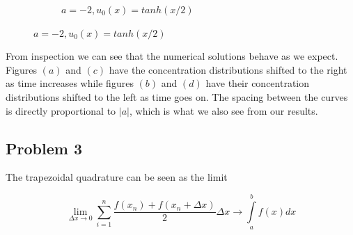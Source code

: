 \documentclass[10pt]{article}
\begin{document}
\begin{figure}[h]
\begin{subfigure}[b]{0.4\textwidth}
            \caption[]%
            {{\small $a = -2, u_0(x) = tanh(x/2)$}}    
            \label{fig:mean and std of net44}
        \end{subfigure}
\end{figure}

\noindent From inspection we can see that the numerical solutions behave as we expect. Figures $(a)$ and $(c)$ have the concentration distributions shifted to the right as time increases while figures $(b)$ and $(d)$ have their concentration distributions shifted to the left as time goes on. The spacing between the curves is directly proportional to $| a |$, which is what we also see from our results. 

\subsection*{Problem 3}

The trapezoidal quadrature can be seen as the limit

$$ \lim\limits_{\Delta x \to 0}\sum\limits_{i=1}^n\frac{f(x_n) + f(x_n + \Delta x)}{2}\Delta x \rightarrow \int\limits_a^b f(x) dx  $$
\end{document}
